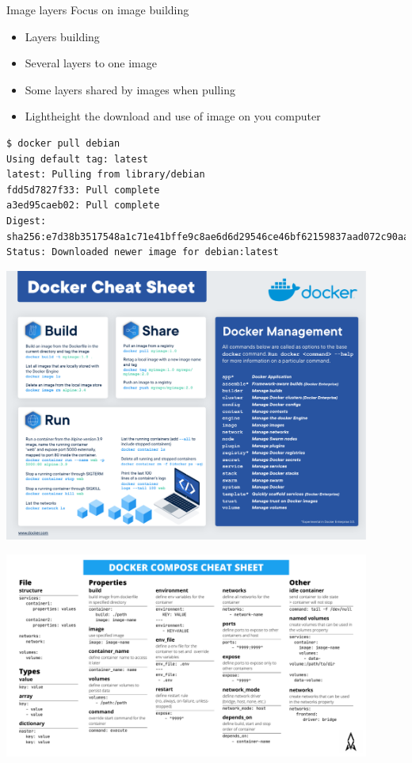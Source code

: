 \begin{frame}[fragile]{Image layers}
Focus on image building
\begin{itemize}
\item Layers building
\item Several layers to one image
\item Some layers shared by images when pulling
\item Lightheight the download and use of image on you computer
\end{itemize}
\begin{verbatim}
$ docker pull debian
Using default tag: latest
latest: Pulling from library/debian
fdd5d7827f33: Pull complete
a3ed95caeb02: Pull complete
Digest: sha256:e7d38b3517548a1c71e41bffe9c8ae6d6d29546ce46bf62159837aad072c90aa
Status: Downloaded newer image for debian:latest
\end{verbatim}
\end{frame}

\begin{frame}
\centering\includegraphics[width=0.9\textwidth]{images/docker-cheat-sheet.pdf}
\end{frame}

\begin{frame}
\centering\includegraphics[width=0.9\textwidth]{images/docker-compose-cheat-sheet.pdf}
\end{frame}

